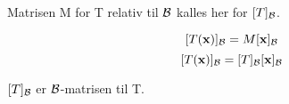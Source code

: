 Matrisen M for T relativ til $\B$ kalles her for $[T]_\B$.

$$[T(\vecx)]_\B = M [\vecx]_\B$$
$$[T(\vecx)]_\B = [T]_\B [\vecx]_\B$$

$[T]_\B$ er $\B$-matrisen til T.
